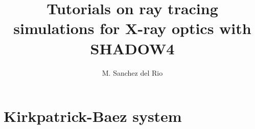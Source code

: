 \documentclass{ol-softwaremanual}
\title{Tutorials on ray tracing simulations for X-ray optics with SHADOW4}
\author{M. Sanchez del Rio}
\begin{document}
\maketitle

\tableofcontents

\newpage
\section{Kirkpatrick-Baez system}


\end{document}
